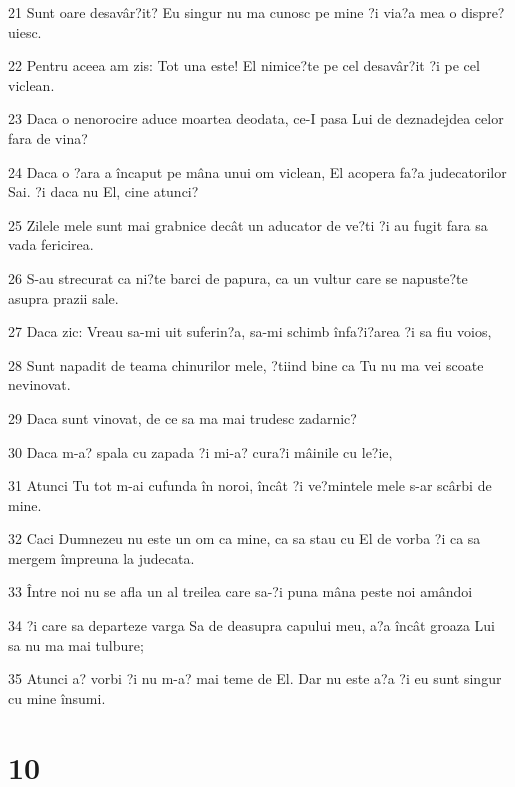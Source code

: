 \par 21 Sunt oare desavâr?it? Eu singur nu ma cunosc pe mine ?i via?a mea o dispre?uiesc.
\par 22 Pentru aceea am zis: Tot una este! El nimice?te pe cel desavâr?it ?i pe cel viclean.
\par 23 Daca o nenorocire aduce moartea deodata, ce-I pasa Lui de deznadejdea celor fara de vina?
\par 24 Daca o ?ara a încaput pe mâna unui om viclean, El acopera fa?a judecatorilor Sai. ?i daca nu El, cine atunci?
\par 25 Zilele mele sunt mai grabnice decât un aducator de ve?ti ?i au fugit fara sa vada fericirea.
\par 26 S-au strecurat ca ni?te barci de papura, ca un vultur care se napuste?te asupra prazii sale.
\par 27 Daca zic: Vreau sa-mi uit suferin?a, sa-mi schimb înfa?i?area ?i sa fiu voios,
\par 28 Sunt napadit de teama chinurilor mele, ?tiind bine ca Tu nu ma vei scoate nevinovat.
\par 29 Daca sunt vinovat, de ce sa ma mai trudesc zadarnic?
\par 30 Daca m-a? spala cu zapada ?i mi-a? cura?i mâinile cu le?ie,
\par 31 Atunci Tu tot m-ai cufunda în noroi, încât ?i ve?mintele mele s-ar scârbi de mine.
\par 32 Caci Dumnezeu nu este un om ca mine, ca sa stau cu El de vorba ?i ca sa mergem împreuna la judecata.
\par 33 Între noi nu se afla un al treilea care sa-?i puna mâna peste noi amândoi
\par 34 ?i care sa departeze varga Sa de deasupra capului meu, a?a încât groaza Lui sa nu ma mai tulbure;
\par 35 Atunci a? vorbi ?i nu m-a? mai teme de El. Dar nu este a?a ?i eu sunt singur cu mine însumi.

\chapter{10}

